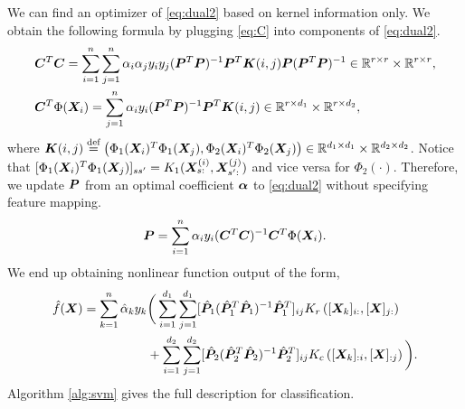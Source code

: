 \documentclass[mathptm]{statsoc}
\begin{document}
We can find an optimizer of \eqref{eq:dual2} based on kernel information only. We obtain the following formula by plugging \eqref{eq:C} into components of \eqref{eq:dual2}. 
\begin{align}\label{eq:helpeq}
 &\bm C^T\bm C = \sum_{i=1}^n\sum_{j=1}^n \alpha_i\alpha_jy_iy_j(\bm{P}^T\bm{P})^{-1}\bm{P}^T\bm K(i,j) \bm{P}(\bm{P}^T\bm{P})^{-1}\in\mathbb{R}^{r\times r}\times \mathbb{R}^{r\times r},\\
 &\bm C^T\Phi(\bm X_i) = \sum_{j=1}^n \alpha_iy_i(\bm{P}^T\bm{P})^{-1}\bm{P}^T\bm K(i,j)\in\mathbb{R}^{r\times d_1}\times \mathbb{R}^{r\times d_2},
\end{align}
where $\bm K(i,j) \stackrel{\text{def}}{=} \left( \Phi_1(\bm X_i)^T\Phi_1(\bm X_j),\Phi_2(\bm X_i)^T\Phi_2(\bm X_j)\right)\in \mathbb{R}^{d_1\times d_1}\times \mathbb{R}^{d_2\times d_2}$. Notice that $[\Phi_1(\bm X_i)^T
\Phi_1(\bm X_j)]_{ss'} = K_1(\bm X^{(i)}_{s:},\bm X^{(j)}_{s':})$ and vice versa for $\Phi_2(\cdot)$.
Therefore, we update $\bm{P}$  from an optimal coefficient $\bm\alpha$ to \eqref{eq:dual2} without specifying feature mapping.
\begin{align}
    \bm{P} = \sum_{i=1}^n\alpha_iy_i(\bm C^T\bm C)^{-1}\bm C^T\Phi(\bm X_i).
\end{align}
We end up obtaining nonlinear function output of the form,
\begin{align}\label{eq:output}
    \hat f(\bm X) = \sum_{k=1}^n\hat\alpha_ky_k&\bigg(\sum_{i=1}^{d_1}\sum_{j=1}^{d_1}[\hat{\bm{P}}_1(\hat{\bm{P}}_1^T\hat{\bm{P}}_1)^{-1}\hat{\bm{P}}_1^T]_{ij}K_r\left([\bm X_k]_{i:},[\bm X]_{j:}\right)\\ &+\sum_{i=1}^{d_2}\sum_{j=1}^{d_2}[\hat{\bm{P}}_2(\hat{\bm{P}}_2^T\hat{\bm{P}}_2)^{-1}\hat{\bm{P}}_2^T]_{ij}K_c\left([\bm X_k]_{:i},[\bm X]_{:j}\right)\bigg).
\end{align}
Algorithm \ref{alg:svm} gives the full description for classification. 
\end{document}
